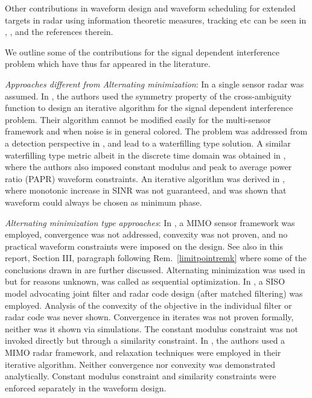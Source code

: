 \documentclass[11pt,draftclsnofoot,onecolumn]{IEEEtran}
\theoremstyle{definition}
\theoremstyle{remark}
\begin{document}
Other contributions in waveform design and waveform scheduling for  extended targets in radar using information theoretic measures, tracking etc can be seen in \cite{setlurspie2012,setlurssp2012,bell1993information,
bell1988thesis,Lesham2007,romero2008information}, \cite{paper:AussiesSensorScheduleRadar,sira2006waveform,
sira2009waveform,Kershaw:2004,kershaw1997waveform,Li2008}, and the references therein.

We outline some of the contributions for the signal dependent interference problem which have thus far appeared in the literature.

{\it Approaches different from Alternating minimization}: In \cite{Delong1967,Kay2007,Pillai2000,Stoica2012} a single sensor radar was assumed. In \cite{Delong1967}, the authors used the symmetry property of the cross-ambiguity function to design an iterative algorithm for the signal dependent interference problem. Their algorithm cannot be modified easily for the multi-sensor framework and when noise is in general colored. The problem was addressed from  a detection perspective in \cite{Kay2007}, and lead to a waterfilling \cite{bell1993information} type solution. A similar waterfilling type metric albeit in the discrete time domain was obtained in \cite{Stoica2012}, where the authors also imposed constant modulus and peak to average power ratio (PAPR) waveform constraints. An iterative algorithm was derived in \cite{Pillai2000}, where monotonic increase in SINR was not guaranteed, and was shown that waveform could always be chosen as minimum phase. 

{\it Alternating minimization type approaches}: In \cite{vaidyanathan2009}, a MIMO sensor framework was employed, convergence was not addressed, convexity was not proven, and no practical waveform constraints were imposed on the design. See also in this report, Section III, paragraph following Rem.~\ref{limitpointremk} where some of the conclusions drawn in \cite{vaidyanathan2009} are further discussed. Alternating minimization was used in \cite{Demaio2012,Demaio2013,Hongbin2014} but for reasons unknown, was called as sequential optimization. In \cite{Demaio2012,Demaio2013}, a SISO model advocating joint filter and radar code design (after matched filtering) was employed.  Analysis of the convexity of the objective in the individual filter or radar code was never shown. Convergence in iterates was not proven formally, neither was it shown via simulations. The constant modulus constraint was not invoked directly but through a similarity constraint. In \cite{Hongbin2014}, the authors used a  MIMO radar framework, and relaxation techniques were employed in their iterative algorithm. Neither convergence nor convexity was demonstrated analytically. Constant modulus constraint and similarity constraints were enforced separately in the waveform design. 
\end{document}
